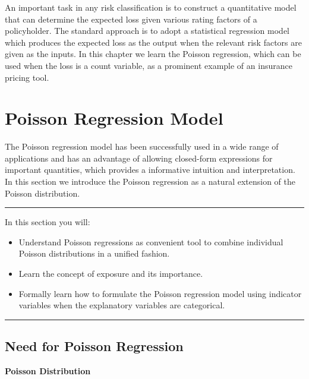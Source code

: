 \documentclass[]{book}
\theoremstyle{definition}
\theoremstyle{definition}
\theoremstyle{definition}
\theoremstyle{remark}
\begin{document}
An important task in any risk classification is to construct a
quantitative model that can determine the expected loss given various
rating factors of a policyholder. The standard approach is to adopt a
statistical regression model which produces the expected loss as the
output when the relevant risk factors are given as the inputs. In this
chapter we learn the Poisson regression, which can be used when the loss
is a count variable, as a prominent example of an insurance pricing
tool.

\section{Poisson Regression Model}\label{S:RC:PoissonRegression}

The Poisson regression model has been successfully used in a wide range
of applications and has an advantage of allowing closed-form expressions
for important quantities, which provides a informative intuition and
interpretation. In this section we introduce the Poisson regression as a
natural extension of the Poisson distribution.

\begin{center}\rule{0.5\linewidth}{\linethickness}\end{center}

In this section you will:

\begin{itemize}
\item
  Understand Poisson regressions as convenient tool to combine
  individual Poisson distributions in a unified fashion.
\item
  Learn the concept of exposure and its importance.
\item
  Formally learn how to formulate the Poisson regression model using
  indicator variables when the explanatory variables are categorical.
\end{itemize}

\begin{center}\rule{0.5\linewidth}{\linethickness}\end{center}

\subsection{Need for Poisson Regression}\label{S:RC:Need.Poi.reg}

\textbf{Poisson Distribution}
\end{document}
